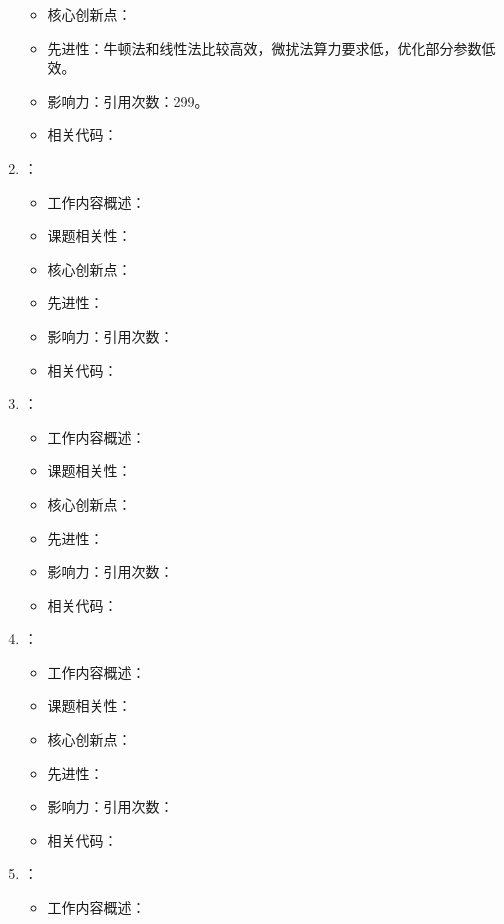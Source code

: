 \begin{enumerate}
\begin{itemize}
                \item 核心创新点：
                \item 先进性：牛顿法和线性法比较高效，微扰法算力要求低，优化部分参数低效。
                \item 影响力：引用次数：299。
                \item 相关代码：
            \end{itemize}
            \item \citet{boixo2014evidence}：
            \begin{itemize}
                \item 工作内容概述：
                \item 课题相关性：
                \item 核心创新点：
                \item 先进性：
                \item 影响力：引用次数：
                \item 相关代码：
            \end{itemize}
        \item \citet{inack2015simulated}：
            \begin{itemize}
                \item 工作内容概述：
                \item 课题相关性：
                \item 核心创新点：
                \item 先进性：
                \item 影响力：引用次数：
                \item 相关代码：
            \end{itemize}
        \item \citet{heim2015quantum}：
            \begin{itemize}
                \item 工作内容概述：
                \item 课题相关性：
                \item 核心创新点：
                \item 先进性：
                \item 影响力：引用次数：
                \item 相关代码：
            \end{itemize}
            \item \citet{isakov2016understanding}：
            \begin{itemize}
                \item 工作内容概述：

\end{itemize}
\end{enumerate}
